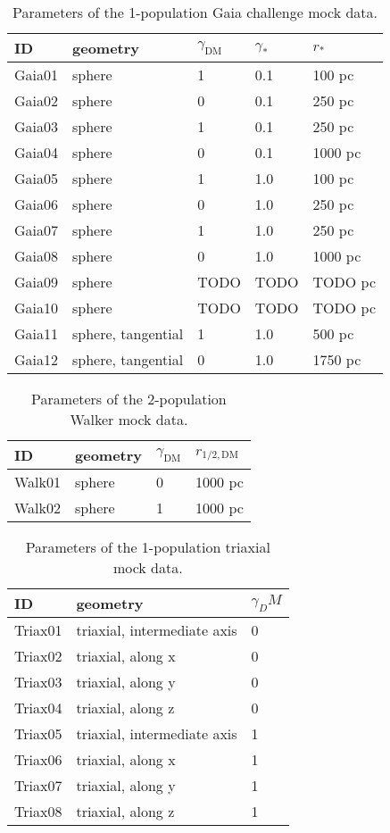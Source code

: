 \begin{table}
    \label{tab:gaia}
    \caption{Parameters of the 1-population Gaia challenge mock data.}
    \centering
    \begin{tabular}{lllll}
        ID & geometry & $\gamma_{\text{DM}}$ & $\gamma_*$ & $r_*$\\
        \hline
        Gaia01 & sphere & 1 & 0.1 & 100 pc\\
        Gaia02 & sphere & 0 & 0.1 & 250 pc\\
        Gaia03 & sphere & 1 & 0.1 & 250 pc\\
        Gaia04 & sphere & 0 & 0.1 & 1000 pc\\
        Gaia05 & sphere & 1 & 1.0 & 100 pc\\
        Gaia06 & sphere & 0 & 1.0 & 250 pc\\
        Gaia07 & sphere & 1 & 1.0 & 250 pc\\
        Gaia08 & sphere & 0 & 1.0 & 1000 pc\\
        Gaia09 & sphere & TODO & TODO & TODO pc\\
        Gaia10 & sphere & TODO & TODO & TODO pc\\
        Gaia11 & sphere, tangential & 1 & 1.0 & 500 pc\\
        Gaia12 & sphere, tangential & 0 & 1.0 & 1750 pc\\\hline\hline
    \end{tabular}
\end{table}

\begin{table}
    \label{tab:walk}
    \caption{Parameters of the 2-population Walker mock data.}
    \centering
    \begin{tabular}{llll}
        ID & geometry & $\gamma_{\text{DM}}$ & $r_{1/2,\text{DM}}$\\
        \hline
        Walk01 & sphere & 0 & 1000 pc \\
        Walk02 & sphere & 1 & 1000 pc\\\hline\hline
    \end{tabular}
\end{table}

\begin{table}
    \label{tab:triax}
    \caption{Parameters of the 1-population triaxial mock data.}
    \centering
    \begin{tabular}{lll}
        ID & geometry & $\gamma_DM$\\
        \hline
        Triax01 & triaxial, intermediate axis & 0\\
        Triax02 & triaxial, along x & 0 \\
        Triax03 & triaxial, along y & 0 \\
        Triax04 & triaxial, along z & 0 \\
        Triax05 & triaxial, intermediate axis & 1\\
        Triax06 & triaxial, along x & 1\\
        Triax07 & triaxial, along y & 1\\
        Triax08 & triaxial, along z & 1\\\hline\hline
    \end{tabular}
\end{table}


